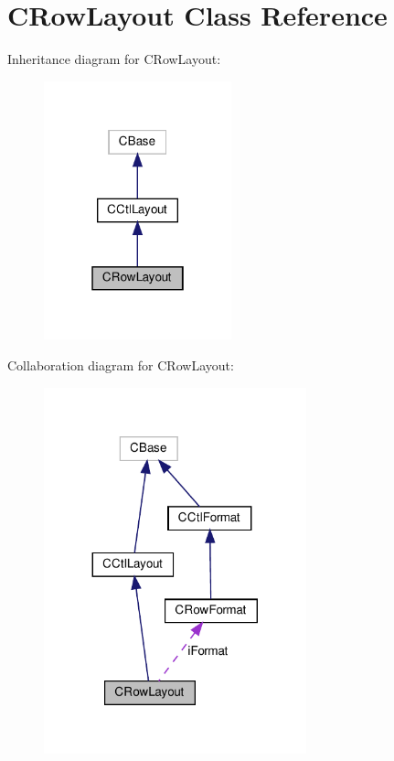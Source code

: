 \hypertarget{classCRowLayout}{}\section{C\+Row\+Layout Class Reference}
\label{classCRowLayout}


Inheritance diagram for C\+Row\+Layout\+:
\nopagebreak
\begin{figure}[H]
\begin{center}
\leavevmode
\includegraphics[width=154pt]{classCRowLayout__inherit__graph}
\end{center}
\end{figure}


Collaboration diagram for C\+Row\+Layout\+:
\nopagebreak
\begin{figure}[H]
\begin{center}
\leavevmode
\includegraphics[width=215pt]{classCRowLayout__coll__graph}
\end{center}
\end{figure}
